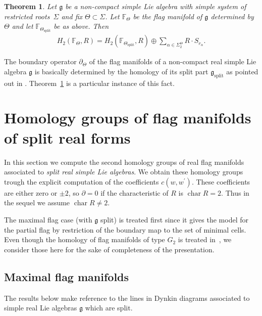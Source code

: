 \documentclass[pdftex]{sigma}
\numberwithin{equation}{section}
\newtheorem{Theorem}{Theorem}[section]
\begin{document}
\begin{Theorem} \label{thm.nosplit}Let $\mathfrak{g}$ be a non-compact simple Lie algebra with simple system of restricted roots~$\Sigma $ and fix $\Theta\subset \Sigma $. Let $\mathbb{F}_{\Theta }$ be the flag manifold of $\mathfrak{g}$ determined by $\Theta $ and let $\mathbb{F}_{\Theta _{\mathrm{split}}}$ be as above. Then
\begin{gather*}
H_{2}(\mathbb{F}_\Theta,R)=H_{2}(\mathbb{F}_{\Theta _{\mathrm{split}}},R)\oplus \sum_{\alpha \in \Sigma _{2}^{\Theta }}R\cdot S_{r_{\alpha }}.
\end{gather*}
\end{Theorem}

\begin{Remark} The boundary operator $\partial _{\Theta }$ of the flag manifolds of a non-compact real simple Lie algebra $\mathfrak{g}$ is basically determined by the homology of its split part $\mathfrak{g}_{\mathrm{split}}$ as pointed out in \cite[p.~18]{RSM}. Theorem~\ref{thm.nosplit} is a particular instance of this fact.
\end{Remark}

\section{Homology groups of flag manifolds of split real forms}\label{sec.comput}

In this section we compute the second homology groups of real flag manifolds associated to \textit{split real simple Lie algebras}. We obtain these homology groups trough the explicit computation of the coefficients $c(w,w^{\prime })$. These coefficients are either zero or $\pm2$, so $\partial=0$ if the characteristic of $R$ is $\operatorname{char}R=2$. Thus in the sequel we assume $\operatorname{char}R\neq 2$.

The maximal flag case (with $\mathfrak{g}$ split) is treated first since it gives the model for the partial flag by restriction of the boundary map to the set of minimal cells. Even though the homology of flag manifolds of type $G_{2}$ is treated in~\cite{RSM}, we consider those here for the sake of completeness of the presentation.

\subsection{Maximal flag manifolds}

The results below make reference to the lines in Dynkin diagrams associated to simple real Lie algebras $\mathfrak{g}$ which are split.
\end{document}
